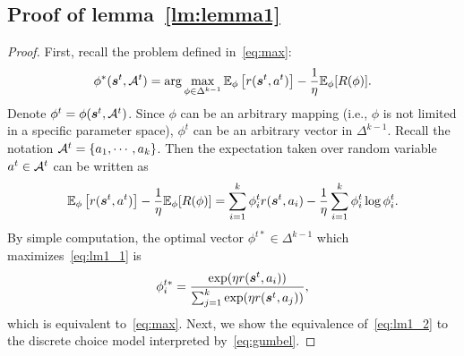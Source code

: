 \documentclass{article} %
\newcommand{\Li}[1]{{\color{cyan}{\bf\sf [Li: #1]}}}
\begin{document}
\subsection{Proof of lemma~\ref{lm:lemma1}} 
\primelemma*
\begin{proof}
First, recall the problem defined in~\eqref{eq:max}:
\[
\phi^*({\bm{s}}^t,{\mathcal{A}}^t) = \arg\max_{\phi \in \Delta^{k-1}} \mathbb{E}_{\phi} \left[r({\bm{s}}^t, a^t) \right] -\frac{1}{\eta}\mathbb{E}_{\phi}[R(\phi)].
\]
Denote $\phi^t = \phi({\bm{s}}^t,{\mathcal{A}}^t)$. Since $\phi$ can be an arbitrary mapping (i.e., $\phi$ is not limited in a specific parameter space), $\phi^t$ can be an arbitrary vector in $\Delta^{k-1}$. Recall the notation ${\mathcal{A}}^t = \{a_1,\cdots, a_k\}$. Then the expectation taken over random variable $a^t\in {\mathcal{A}}^t$ can be written as
\begin{equation}\label{eq:lm1_1}
     \mathbb{E}_{\phi} \left[r({\bm{s}}^t, a^t) \right] -\frac{1}{\eta}\mathbb{E}_{\phi}[R(\phi)] =\sum_{i=1}^k \phi_i^tr({\bm{s}}^t, a_i) -\frac{1}{\eta} \sum_{i=1}^k \phi_i^t \log \phi_i^t.
\end{equation}
By simple computation, the optimal vector $\phi^{t*}\in \Delta^{k-1}$ which maximizes~\eqref{eq:lm1_1} is
\begin{equation}\label{eq:lm1_2}
    \phi_i^{t*} =\dfrac{\exp(\eta r({\bm{s}}^t, a_i))}{\sum_{j=1}^{k}\exp(\eta r({\bm{s}}^t, a_j))},
\end{equation}
\Li{fix the typo in above equation.}
which is equivalent to~\eqref{eq:max}. Next, we show the equivalence of~\eqref{eq:lm1_2} to the discrete choice model interpreted by~\eqref{eq:gumbel}.


\end{proof}
\end{document}
